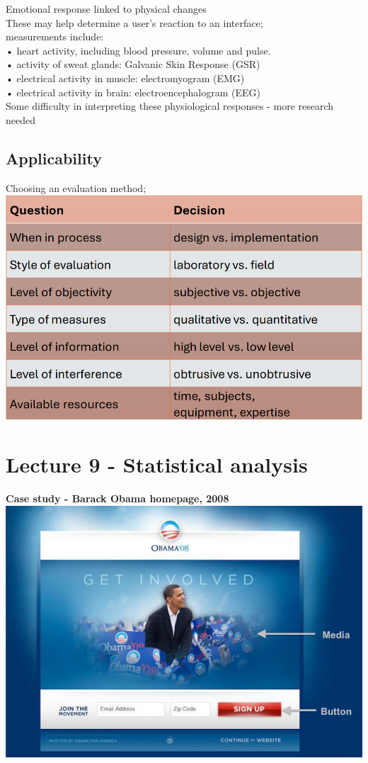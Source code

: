 \documentclass[]{project_plan}
\begin{document}
Emotional response linked to physical changes\\
These may help determine a user’s reaction to an interface;\\
measurements include:\\
• heart activity, including blood pressure, volume and pulse.\\
• activity of sweat glands: Galvanic Skin Response (GSR)\\
• electrical activity in muscle: electromyogram (EMG)\\
• electrical activity in brain: electroencephalogram (EEG)\\
Some difficulty in interpreting these physiological responses - more research
needed

\section{Applicability}

Choosing an evaluation method;\\
\includegraphics[width=0.6\linewidth]{applicability_testing.png}

\chapter{Lecture 9 - Statistical analysis}

\textbf{Case study - Barack Obama homepage, 2008}\\
\includegraphics[width=\linewidth]{case_study.png}
\end{document}
